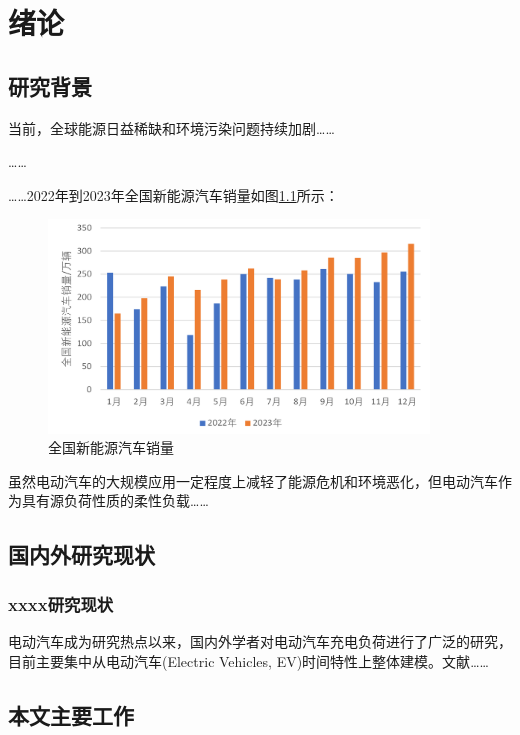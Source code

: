 
\chapter{绪论}
\label{chap:introduction}
\section{研究背景}
\label{sec:meaning}

当前，全球能源日益稀缺和环境污染问题持续加剧……

……

……2022年到2023年全国新能源汽车销量如图\ref{fig:xnll}所示：

\begin{figure}[H]
    \centering
    \includegraphics[width=0.9\textwidth]{figures/xnll.png}
    \caption{全国新能源汽车销量}
    \label{fig:xnll}
\end{figure}

虽然电动汽车的大规模应用一定程度上减轻了能源危机和环境恶化，但电动汽车作为具有源负荷性质的柔性负载……

\section{国内外研究现状}

\subsection{xxxx研究现状}

电动汽车成为研究热点以来，国内外学者对电动汽车充电负荷进行了广泛的研究，目前主要集中从电动汽车(Electric Vehicles, EV)时间特性上整体建模。文献\cite{1021704678.nh}……

\section{本文主要工作}
